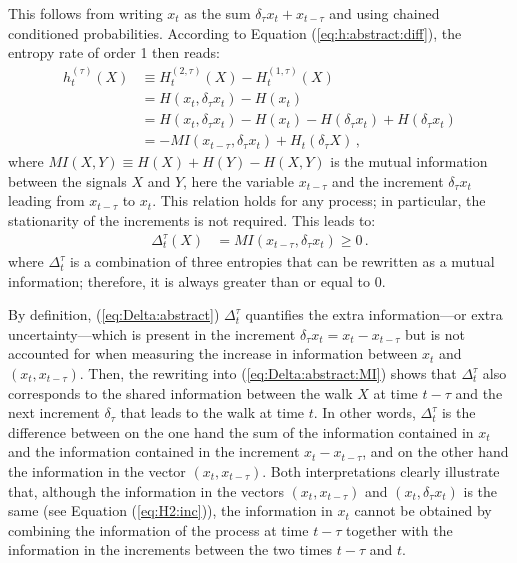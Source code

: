 \documentclass[aps,pra,groupedaddress,notitlepage]{revtex4-1}
\begin{document}
This follows from writing $x_t$ as the sum $\delta_\tau x_t + x_{t-\tau}$ and using chained conditioned probabilities.
%
According to Equation (\ref{eq:h:abstract:diff}), the entropy rate of order 1 then reads:
\begin{align}
h^{(\tau)}_t(X) &\equiv H^{(2,\tau)}_t(X) - H^{(1,\tau)}_t(X) \nonumber \\
&= H(x_t, \delta_\tau x_t) - H(x_t) \nonumber \\
&= H(x_t, \delta_\tau x_t) - H(x_t) - H(\delta_\tau x_t) + H( \delta_\tau x_t) \nonumber \\
&= - MI( x_{t-\tau}, \delta_\tau x_t) + H_t(\delta_{\tau} X)   \label{eq:h_vs_Hinc}\,,
\end{align}
%
where $MI(X,Y)\equiv H(X)+H(Y)-H(X,Y)$ is the mutual information between the signals $X$ and $Y$, here the variable $x_{t-\tau}$ and the increment $\delta_\tau x_t$ leading from $x_{t-\tau}$ to $x_t$.
This relation holds for any process; in particular, the stationarity of the increments is not required. This leads to:
%
\begin{align}
\Delta_t^{\tau}(X) &= MI( x_{t-\tau}, \delta_\tau x_t) \ge 0 \,. \label{eq:Delta:abstract:MI} 
\end{align}
%
where $\Delta_t^{\tau}$ is a combination of three entropies that can be rewritten as a mutual information; therefore, it is always greater than or equal to 0.

By definition, (\ref{eq:Delta:abstract}) $\Delta_t^{\tau}$ quantifies the extra information---or extra uncertainty---which is present in the increment $\delta_\tau x_t = x_t - x_{t-\tau}$ but is not accounted for when measuring the increase in information between $x_{t}$ and $(x_t, x_{t-\tau})$. Then, the rewriting into (\ref{eq:Delta:abstract:MI}) shows that $\Delta_t^{\tau}$ also corresponds to the shared information between the walk $X$ at time $t-\tau$ and the next increment $\delta_\tau$ that leads to the walk at time $t$. In other words, $\Delta_t^{\tau}$ is the difference between on the one hand the sum of the information contained in $x_t$ and the information contained in the increment $x_{t}-x_{t-\tau}$, and on the other hand the information in the vector $(x_t,x_{t-\tau})$. 
%
Both interpretations clearly illustrate that, although the information in the vectors $(x_t, x_{t-\tau})$ and $(x_t, \delta_\tau x_t)$ is the same (see Equation (\ref{eq:H2:inc})), the information in $x_t$ cannot be obtained by combining the information of the process at time $t-\tau$ together with 
the information in the increments between the two times $t-\tau$ and $t$.
\end{document}
